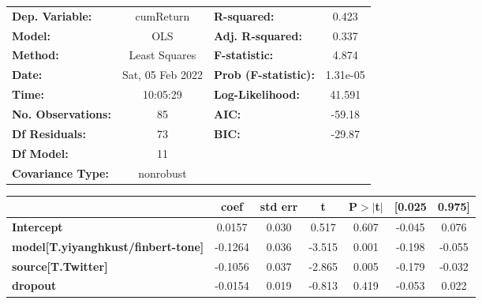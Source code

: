 \begin{center}
\begin{tabular}{lclc}
\toprule
\textbf{Dep. Variable:}                    &    cumReturn     & \textbf{  R-squared:         } &     0.423   \\
\textbf{Model:}                            &       OLS        & \textbf{  Adj. R-squared:    } &     0.337   \\
\textbf{Method:}                           &  Least Squares   & \textbf{  F-statistic:       } &     4.874   \\
\textbf{Date:}                             & Sat, 05 Feb 2022 & \textbf{  Prob (F-statistic):} &  1.31e-05   \\
\textbf{Time:}                             &     10:05:29     & \textbf{  Log-Likelihood:    } &    41.591   \\
\textbf{No. Observations:}                 &          85      & \textbf{  AIC:               } &    -59.18   \\
\textbf{Df Residuals:}                     &          73      & \textbf{  BIC:               } &    -29.87   \\
\textbf{Df Model:}                         &          11      & \textbf{                     } &             \\
\textbf{Covariance Type:}                  &    nonrobust     & \textbf{                     } &             \\
\bottomrule
\end{tabular}
\begin{tabular}{lcccccc}
                                           & \textbf{coef} & \textbf{std err} & \textbf{t} & \textbf{P$> |$t$|$} & \textbf{[0.025} & \textbf{0.975]}  \\
\midrule
\textbf{Intercept}                         &       0.0157  &        0.030     &     0.517  &         0.607        &       -0.045    &        0.076     \\
\textbf{model[T.yiyanghkust/finbert-tone]} &      -0.1264  &        0.036     &    -3.515  &         0.001        &       -0.198    &       -0.055     \\
\textbf{source[T.Twitter]}                 &      -0.1056  &        0.037     &    -2.865  &         0.005        &       -0.179    &       -0.032     \\
\textbf{dropout}                           &      -0.0154  &        0.019     &    -0.813  &         0.419        &       -0.053    &        0.022     \\

\end{tabular}
\end{center}
